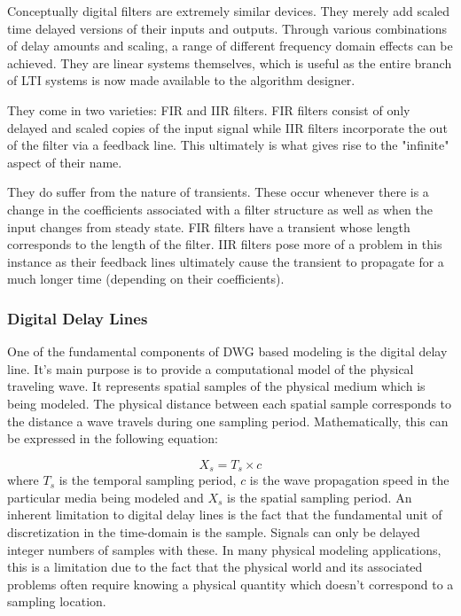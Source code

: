 \documentclass[main.tex]{subfiles}
\begin{document}
Conceptually digital filters are extremely similar devices. They merely add scaled time delayed versions of their inputs and outputs. Through various combinations of delay amounts and scaling, a range of different frequency domain effects can be achieved. They are linear systems themselves, which is useful as the entire branch of LTI systems is now made available to the algorithm designer.

They come in two varieties: FIR and IIR filters. FIR filters consist of only delayed and scaled copies of the input signal while IIR filters incorporate the out of the filter via a feedback line. This ultimately is what gives rise to the "infinite" aspect of their name.

They do suffer from the nature of transients. These occur whenever there is a change in the coefficients associated with a filter structure as well as when the input changes from steady state. FIR filters have a transient whose length corresponds to the length of the filter. IIR filters pose more of a problem in this instance as their feedback lines ultimately cause the transient to propagate for a much longer time (depending on their coefficients).

\subsubsection{Digital Delay Lines}

One of the fundamental components of DWG based modeling is the digital delay line. It's main purpose is to provide a computational model of the physical traveling wave. It represents spatial samples of the physical medium which is being modeled. The physical distance between each spatial sample corresponds to the distance a wave travels during one sampling period. Mathematically, this can be expressed in the following equation:

\begin{equation}
    X_s = T_s \times c
\end{equation}
where $T_s$ is the temporal sampling period, $c$ is the wave propagation speed in the particular media being modeled and $X_s$ is the spatial sampling period.
An inherent limitation to digital delay lines is the fact that the fundamental unit of discretization in the time-domain is the sample. Signals can only be delayed integer numbers of samples with these. In many physical modeling applications, this is a limitation due to the fact that the physical world and its associated problems often require knowing a physical quantity which doesn't correspond to a sampling location.
\end{document}
